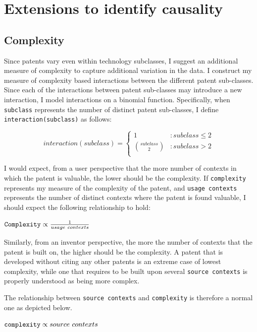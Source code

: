 \documentclass[12pt]{article}
\begin{document}
\section{Extensions to identify causality}
\subsection{Complexity}
Since patents vary even within technology subclasses, I suggest an additional measure of complexity to capture additional variation in the data. I construct my measure of complexity based interactions between the different patent sub-classes. Since each of the interactions between patent sub-classes may introduce a new interaction, I model interactions on a binomial function. Specifically, when \verb|subclass| represents the number of distinct patent sub-classes, I define  \verb|interaction(subclass)| as follows:

\begin{displaymath}
   interaction(subclass) = \left\{
     \begin{array}{lr}
       1 & : subclass \leq 2 \\
       \binom{subclass}{2} & : subclass > 2 \\
     \end{array}
   \right.
\end{displaymath} 

I would expect, from a user perspective that the more number of contexts in which the patent is valuable, the lower should be the complexity. If \verb|complexity| represents my measure of the complexity of the patent, and \verb|usage contexts| represents the number of distinct contexts where the patent is found valuable, I should expect the following relationship to hold:
\begin{center}$ \verb|Complexity| \propto \frac{1}{usage \ contexts} $ \end{center}
Similarly, from an inventor perspective, the more the number of contexts that the patent is built on, the higher should be the complexity. A patent that is developed without citing any other patents is an extreme case of lowest complexity, while one that requires to be built upon several \verb|source contexts| is properly understood as being more complex. 

The relationship between \verb|source contexts| and \verb|complexity| is therefore a normal one as depicted below.
\begin{center}$ \verb|complexity| \propto source \ contexts $ \end{center} 
\end{document}
